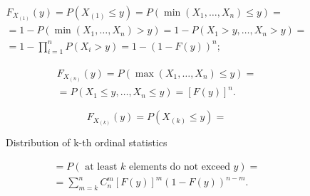 \begin{gather*}
    F_{X_{(1)}}(y) = P( X_{(1)} \leq y ) = P( \min \left( X_1, \ldots, X_n \right) \leq y) = \\
    = 1 - P( \min \left( X_1, \ldots, X_n \right) > y) = 1 - P( X_1 > y, \ldots, X_n > y) = \\
    = 1 - \prod_{i=1}^{n} P( X_i > y) = 1 - \left( 1 - F(y) \right) ^{n} ; 
\end{gather*}

\begin{gather*}
    F_{X_{(n)}} (y) = P \left( \max \left( X_1, \ldots, X_n \right) \leq y \right) = \\
    = P\left( X_1 \leq y, \ldots, X_n \leq y \right) = \left[ F (y) \right] ^{n}.
\end{gather*}

\[
F_{ X_{(k)} } (y) = P \left( X_{(k)} \leq y \right) =
\] 
\begin{figure}[ht]
    \centering
    \caption{Distribution of k-th ordinal statistics}
    \label{fig:distribution-of-k-th-ordinal-statistics}
\end{figure}

\begin{gather*}
    = P \left( \text{ at least $k$ elements do not exceed $y$} \right) = \\
    = \sum_{m=k}^{n}  C_n^m \left[ F(y) \right]^m \left( 1 - F(y) \right) ^{n-m}.
\end{gather*}


